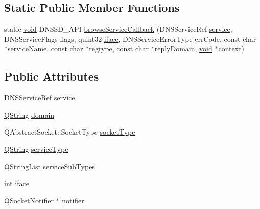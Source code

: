 \subsection*{Static Public Member Functions}
\begin{DoxyCompactItemize}
\item 
static \hyperlink{group___u_a_v_objects_plugin_ga444cf2ff3f0ecbe028adce838d373f5c}{void} D\-N\-S\-S\-D\-\_\-\-A\-P\-I \hyperlink{class_qxt_service_browser_private_ad6a67b57db30230d715726ace5d10598}{browse\-Service\-Callback} (D\-N\-S\-Service\-Ref \hyperlink{class_qxt_service_browser_private_a63f1b88da5fbdd8de21d6698711b6c64}{service}, D\-N\-S\-Service\-Flags flags, quint32 \hyperlink{class_qxt_service_browser_private_a134886c8e04b918ff8b0cba73a5aa503}{iface}, D\-N\-S\-Service\-Error\-Type err\-Code, const char $\ast$service\-Name, const char $\ast$regtype, const char $\ast$reply\-Domain, \hyperlink{group___u_a_v_objects_plugin_ga444cf2ff3f0ecbe028adce838d373f5c}{void} $\ast$context)
\end{DoxyCompactItemize}
\subsection*{Public Attributes}
\begin{DoxyCompactItemize}
\item 
D\-N\-S\-Service\-Ref \hyperlink{class_qxt_service_browser_private_a63f1b88da5fbdd8de21d6698711b6c64}{service}
\item 
\hyperlink{group___u_a_v_objects_plugin_gab9d252f49c333c94a72f97ce3105a32d}{Q\-String} \hyperlink{class_qxt_service_browser_private_ab3515791297ba34e78c8998f94d82dd9}{domain}
\item 
Q\-Abstract\-Socket\-::\-Socket\-Type \hyperlink{class_qxt_service_browser_private_a630a97096cfea7bc1f77b95593cc265e}{socket\-Type}
\item 
\hyperlink{group___u_a_v_objects_plugin_gab9d252f49c333c94a72f97ce3105a32d}{Q\-String} \hyperlink{class_qxt_service_browser_private_a4360aeb42929ae409ebf36d1bbcc2e1d}{service\-Type}
\item 
Q\-String\-List \hyperlink{class_qxt_service_browser_private_ab21ba745c800294e8385135c14a78000}{service\-Sub\-Types}
\item 
\hyperlink{ioapi_8h_a787fa3cf048117ba7123753c1e74fcd6}{int} \hyperlink{class_qxt_service_browser_private_a134886c8e04b918ff8b0cba73a5aa503}{iface}
\item 
Q\-Socket\-Notifier $\ast$ \hyperlink{class_qxt_service_browser_private_a2e77003ebf8a8722e0c0d8cb3793dfc4}{notifier}
\end{DoxyCompactItemize}
